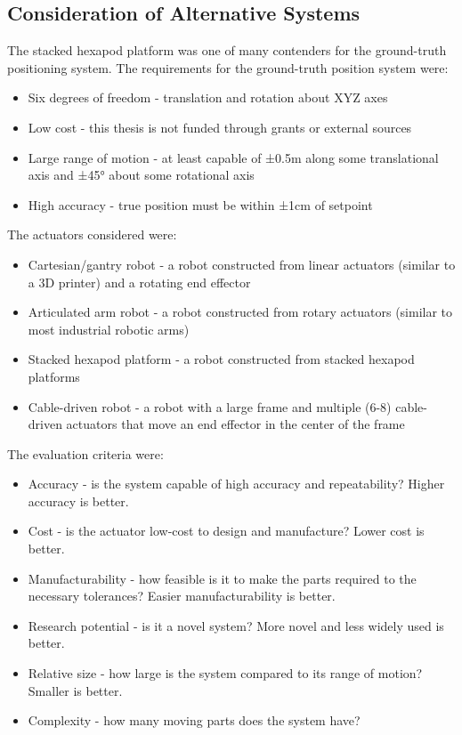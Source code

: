 \documentclass[12pt,a4paper]{report}
\begin{document}
\subsection{Consideration of Alternative Systems} \label{ssec:2s1s4}
The stacked hexapod platform was one of many contenders for the ground-truth positioning system. The requirements for the ground-truth position system were:

\begin{itemize}[noitemsep,topsep=0pt]
	\item Six degrees of freedom - translation and rotation about XYZ axes
	\item Low cost - this thesis is not funded through grants or external sources
	\item Large range of motion - at least capable of ±0.5m along some translational axis and ±45° about some rotational axis
	\item High accuracy - true position must be within ±1cm of setpoint
\end{itemize}

\noindent The actuators considered were:

\begin{itemize}[noitemsep,topsep=0pt]
	\item Cartesian/gantry robot - a robot constructed from linear actuators (similar to a 3D printer) and a rotating end effector
	\item Articulated arm robot - a robot constructed from rotary actuators (similar to most industrial robotic arms)
	\item Stacked hexapod platform - a robot constructed from stacked hexapod platforms
	\item Cable-driven robot - a robot with a large frame and multiple (6-8) cable-driven actuators that move an end effector in the center of the frame
\end{itemize}

\vspace{2ex}
\noindent The evaluation criteria were:

\begin{itemize}[noitemsep,topsep=0pt,]
	\item Accuracy - is the system capable of high accuracy and repeatability? Higher accuracy is better.
	\item Cost - is the actuator low-cost to design and manufacture? Lower cost is better.
	\item Manufacturability - how feasible is it to make the parts required to the necessary tolerances? Easier manufacturability is better.
	\item Research potential - is it a novel system? More novel and less widely used is better.
	\item Relative size - how large is the system compared to its range of motion? Smaller is better.
	\item Complexity - how many moving parts does the system have?
\end{itemize}
\end{document}
